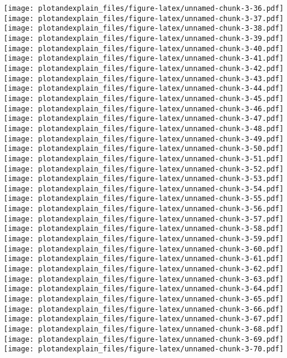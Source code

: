 \documentclass[]{article}
\begin{document}
\texttt{[image: plotandexplain\_files/figure-latex/unnamed-chunk-3-36.pdf]}
\texttt{[image: plotandexplain\_files/figure-latex/unnamed-chunk-3-37.pdf]}
\texttt{[image: plotandexplain\_files/figure-latex/unnamed-chunk-3-38.pdf]}
\texttt{[image: plotandexplain\_files/figure-latex/unnamed-chunk-3-39.pdf]}
\texttt{[image: plotandexplain\_files/figure-latex/unnamed-chunk-3-40.pdf]}
\texttt{[image: plotandexplain\_files/figure-latex/unnamed-chunk-3-41.pdf]}
\texttt{[image: plotandexplain\_files/figure-latex/unnamed-chunk-3-42.pdf]}
\texttt{[image: plotandexplain\_files/figure-latex/unnamed-chunk-3-43.pdf]}
\texttt{[image: plotandexplain\_files/figure-latex/unnamed-chunk-3-44.pdf]}
\texttt{[image: plotandexplain\_files/figure-latex/unnamed-chunk-3-45.pdf]}
\texttt{[image: plotandexplain\_files/figure-latex/unnamed-chunk-3-46.pdf]}
\texttt{[image: plotandexplain\_files/figure-latex/unnamed-chunk-3-47.pdf]}
\texttt{[image: plotandexplain\_files/figure-latex/unnamed-chunk-3-48.pdf]}
\texttt{[image: plotandexplain\_files/figure-latex/unnamed-chunk-3-49.pdf]}
\texttt{[image: plotandexplain\_files/figure-latex/unnamed-chunk-3-50.pdf]}
\texttt{[image: plotandexplain\_files/figure-latex/unnamed-chunk-3-51.pdf]}
\texttt{[image: plotandexplain\_files/figure-latex/unnamed-chunk-3-52.pdf]}
\texttt{[image: plotandexplain\_files/figure-latex/unnamed-chunk-3-53.pdf]}
\texttt{[image: plotandexplain\_files/figure-latex/unnamed-chunk-3-54.pdf]}
\texttt{[image: plotandexplain\_files/figure-latex/unnamed-chunk-3-55.pdf]}
\texttt{[image: plotandexplain\_files/figure-latex/unnamed-chunk-3-56.pdf]}
\texttt{[image: plotandexplain\_files/figure-latex/unnamed-chunk-3-57.pdf]}
\texttt{[image: plotandexplain\_files/figure-latex/unnamed-chunk-3-58.pdf]}
\texttt{[image: plotandexplain\_files/figure-latex/unnamed-chunk-3-59.pdf]}
\texttt{[image: plotandexplain\_files/figure-latex/unnamed-chunk-3-60.pdf]}
\texttt{[image: plotandexplain\_files/figure-latex/unnamed-chunk-3-61.pdf]}
\texttt{[image: plotandexplain\_files/figure-latex/unnamed-chunk-3-62.pdf]}
\texttt{[image: plotandexplain\_files/figure-latex/unnamed-chunk-3-63.pdf]}
\texttt{[image: plotandexplain\_files/figure-latex/unnamed-chunk-3-64.pdf]}
\texttt{[image: plotandexplain\_files/figure-latex/unnamed-chunk-3-65.pdf]}
\texttt{[image: plotandexplain\_files/figure-latex/unnamed-chunk-3-66.pdf]}
\texttt{[image: plotandexplain\_files/figure-latex/unnamed-chunk-3-67.pdf]}
\texttt{[image: plotandexplain\_files/figure-latex/unnamed-chunk-3-68.pdf]}
\texttt{[image: plotandexplain\_files/figure-latex/unnamed-chunk-3-69.pdf]}
\texttt{[image: plotandexplain\_files/figure-latex/unnamed-chunk-3-70.pdf]}
\end{document}
